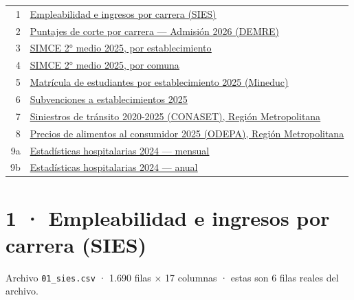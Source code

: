 \documentclass[10pt]{article}
\begin{document}
\vspace{4pt}
\begin{guiabox}[Índice]
\begin{tabular}{@{}r l@{}}
1 & \hyperlink{base1}{\textcolor{azuloscuro}{\underline{Empleabilidad e ingresos por carrera (SIES)}}} \\
2 & \hyperlink{base2}{\textcolor{azuloscuro}{\underline{Puntajes de corte por carrera — Admisión 2026 (DEMRE)}}} \\
3 & \hyperlink{base3}{\textcolor{azuloscuro}{\underline{SIMCE 2° medio 2025, por establecimiento}}} \\
4 & \hyperlink{base4}{\textcolor{azuloscuro}{\underline{SIMCE 2° medio 2025, por comuna}}} \\
5 & \hyperlink{base5}{\textcolor{azuloscuro}{\underline{Matrícula de estudiantes por establecimiento 2025 (Mineduc)}}} \\
6 & \hyperlink{base6}{\textcolor{azuloscuro}{\underline{Subvenciones a establecimientos 2025}}} \\
7 & \hyperlink{base7}{\textcolor{azuloscuro}{\underline{Siniestros de tránsito 2020-{}2025 (CONASET), Región Metropolitana}}} \\
8 & \hyperlink{base8}{\textcolor{azuloscuro}{\underline{Precios de alimentos al consumidor 2025 (ODEPA), Región Metropolitana}}} \\
9a & \hyperlink{base9a}{\textcolor{azuloscuro}{\underline{Estadísticas hospitalarias 2024 — mensual}}} \\
9b & \hyperlink{base9b}{\textcolor{azuloscuro}{\underline{Estadísticas hospitalarias 2024 — anual}}} \\
\end{tabular}
\end{guiabox}

\clearpage
\hypertarget{base1}{}
\section{1 · Empleabilidad e ingresos por carrera (SIES)}
\small Archivo \texttt{01\_sies.csv} · 1.690 filas × 17 columnas · estas son 6 filas reales del archivo.\normalsize
\end{document}
